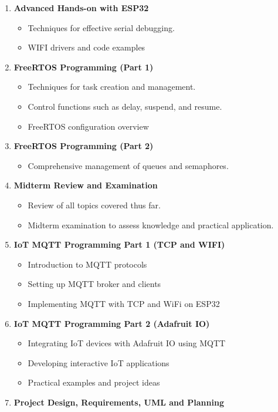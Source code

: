 \begin{enumerate}[label=\textbf{Week \arabic*:}]
\begin{itemize}
\end{itemize}
\item \textbf{ Advanced Hands-on with ESP32 }
\begin{itemize}
  \item Techniques for effective serial debugging.
  \item WIFI drivers and code examples
\end{itemize}
\item \textbf{ FreeRTOS Programming (Part 1) }
\begin{itemize}
  \item Techniques for task creation and management.
  \item Control functions such as delay, suspend, and resume.
  \item FreeRTOS configuration overview
\end{itemize}
\item \textbf{ FreeRTOS Programming (Part 2) }
\begin{itemize}
  \item Comprehensive management of queues and semaphores.
\end{itemize}
\item \textbf{ Midterm Review and Examination }
\begin{itemize}
  \item Review of all topics covered thus far.
  \item Midterm examination to assess knowledge and practical application.
\end{itemize}
\item \textbf{ IoT MQTT Programming Part 1 (TCP and WIFI) }
\begin{itemize}
  \item Introduction to MQTT protocols
  \item Setting up MQTT broker and clients
  \item Implementing MQTT with TCP and WiFi on ESP32
\end{itemize}
\item \textbf{ IoT MQTT Programming Part 2 (Adafruit IO) }
\begin{itemize}
  \item Integrating IoT devices with Adafruit IO using MQTT
  \item Developing interactive IoT applications
  \item Practical examples and project ideas
\end{itemize}
\item \textbf{ Project Design, Requirements, UML and Planning }

\end{enumerate}
